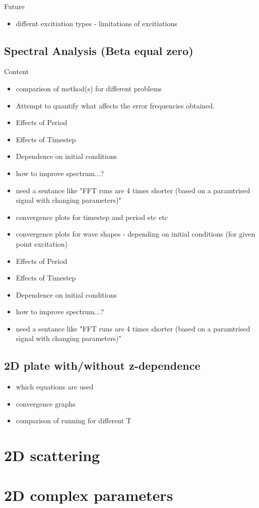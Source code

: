 Future
\begin{itemize}
\item differnt excitiation types - limitations of excitiations
\end{itemize}

\subsection{Spectral Analysis (Beta equal zero)}
Content
\begin{itemize}
\item comparison of method(s) for different problems
\item Attempt to quantify what affects the error frequencies obtained.
\item Effects of Period
\item Effects of Timestep
\item Dependence on initial conditions
\item how to improve spectrum...?
\item need a sentance like "FFT runs are 4 times shorter (based on a paramtrised signal with changing parameters)"
\end{itemize}

\begin{itemize}
\item convergence plots for timestep and period etc etc
\item convergence plots for wave shapes - depending on initial conditions (for given point excitation)
\item Effects of Period
\item Effects of Timestep
\item Dependence on initial conditions
\item how to improve spectrum...?
\item need a sentance like "FFT runs are 4 times shorter (based on a paramtrised signal with changing parameters)"
\end{itemize}

\subsection{2D plate with/without z-dependence}
\begin{itemize}
\item which equations are used
\item convergence graphs
\item comparison of running for different T
\end{itemize}
\section{2D scattering}
\section{2D complex parameters}